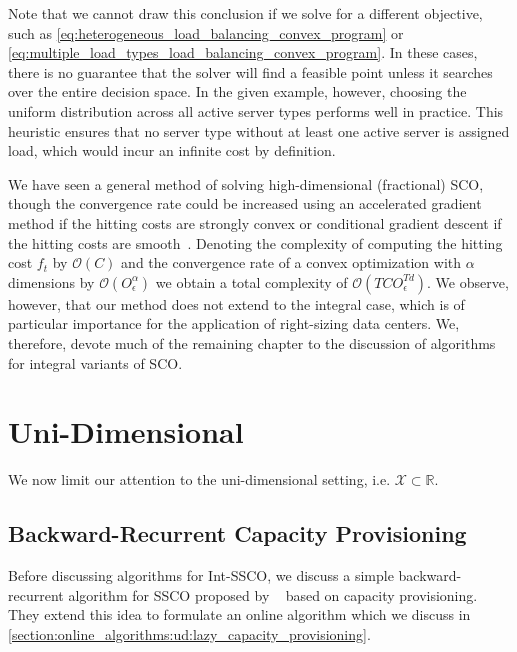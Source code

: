 Note that we cannot draw this conclusion if we solve for a different objective, such as \cref{eq:heterogeneous_load_balancing_convex_program} or \cref{eq:multiple_load_types_load_balancing_convex_program}. In these cases, there is no guarantee that the solver will find a feasible point unless it searches over the entire decision space. In the given example, however, choosing the uniform distribution across all active server types performs well in practice. This heuristic ensures that no server type without at least one active server is assigned load, which would incur an infinite cost by definition.

We have seen a general method of solving high-dimensional (fractional) SCO, though the convergence rate could be increased using an accelerated gradient method if the hitting costs are strongly convex or conditional gradient descent if the hitting costs are smooth~\cite{Bubeck2015}. Denoting the complexity of computing the hitting cost $f_t$ by $\mathcal{O}(C)$ and the convergence rate of a convex optimization with $\alpha$ dimensions by $\mathcal{O}(O_{\epsilon}^{\alpha})$ we obtain a total complexity of $\mathcal{O}(T C O_{\epsilon}^{T d})$. We observe, however, that our method does not extend to the integral case, which is of particular importance for the application of right-sizing data centers. We, therefore, devote much of the remaining chapter to the discussion of algorithms for integral variants of SCO.

\section{Uni-Dimensional}

We now limit our attention to the uni-dimensional setting, i.e. $\mathcal{X} \subset \mathbb{R}$.

\subsection{Backward-Recurrent Capacity Provisioning}\label{section:offline_algorithms:ud:capacity_provisioning}

Before discussing algorithms for Int-SSCO, we discuss a simple backward-recurrent algorithm for SSCO proposed by \citeauthor*{Lin2011}~\cite{Lin2011} based on capacity provisioning. They extend this idea to formulate an online algorithm which we discuss in \cref{section:online_algorithms:ud:lazy_capacity_provisioning}.

